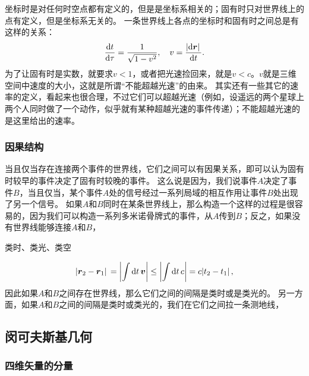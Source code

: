 \documentclass[hyperref, UTF8, a4paper]{ctexart}
\begin{document}
坐标时是对任何时空点都有定义的，但是是坐标系相关的；固有时只对世界线上的点有定义，但是坐标系无关的。
一条世界线上各点的坐标时和固有时之间总是有这样的关系：
\begin{equation}
    \dv{t}{\tau} = \frac{1}{\sqrt{1 - v^2}}, \quad v = \frac{\abs*{\dd{\vb*{r}}}}{\dd{t}}.
\end{equation}
为了让固有时是实数，就要求$v < 1$，或者把光速捡回来，就是$v < c$。$v$就是三维空间中速度的大小，这就是所谓“不能超越光速”的由来。
其实还有一些其它的速率的定义，看起来也很合理，不过它们可以超越光速（例如，设遥远的两个星球上两个人同时做了一个动作，似乎就有某种超越光速的事件传递）；不能超越光速的是这里给出的速率。

\subsubsection{因果结构}

当且仅当存在连接两个事件的世界线，它们之间可以有因果关系，即可以认为固有时较早的事件决定了固有时较晚的事件。
这么说是因为，我们说事件$A$决定了事件$B$，当且仅当，某个事件$A$处的信号经过一系列局域的相互作用让事件$B$处出现了另一个信号。
如果$A$和$B$同时在某条世界线上，那么构造一个这样的过程是很容易的，因为我们可以构造一系列多米诺骨牌式的事件，从$A$传到$B$；反之，如果没有世界线能够连接$A$和$B$，

类时、类光、类空

\[
    \abs*{\vb*{r}_2 - \vb*{r}_1} = \abs{\int \dd{t} \vb*{v}} \leq \abs{\int \dd{t} c} = c \abs*{t_2 - t_1},
\]
因此如果$A$和$B$之间存在世界线，那么它们之间的间隔是类时或是类光的。
另一方面，如果$A$和$B$之间的间隔是类时或类光的，我们在它们之间拉一条测地线，

\subsection{闵可夫斯基几何}

\subsubsection{四维矢量的分量}\label{sec:components-of-four-vector}
\end{document}
